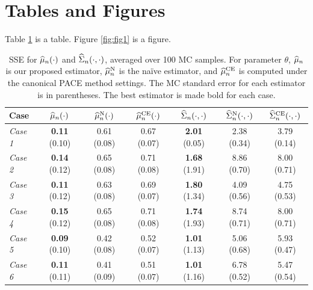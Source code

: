 \documentclass[useAMS, referee, usenatbib]{biom}
\begin{document}
\section*{Tables and Figures}
Table \ref{t:table1} is a table. Figure \ref{fig:fig1} is a figure.

\begin{table}
\centering
\begin{tabular*}{\columnwidth}{l@{\extracolsep{\fill}} 
c@{\extracolsep{\fill}}
c@{\extracolsep{\fill}}
c@{\extracolsep{\fill}}
c@{\extracolsep{\fill}}
c@{\extracolsep{\fill}}
c@{\extracolsep{\fill}}}
\hline
Case & $\widehat{\mu}_n(\cdot)$ & $\widehat{\mu}_n^{\text{N}}(\cdot)$ & $\widehat{\mu}_n^{\text{CE}}(\cdot)$ & $\widehat{\Sigma}_n(\cdot,\cdot)$ & $\widehat{\Sigma}_n^{\text{N}}(\cdot,\cdot)$ & $\widehat{\Sigma}_n^{\text{CE}}(\cdot,\cdot)$\\ 
\hline
\textit{Case 1 } & \textbf{0.11} (0.10) & 0.61 (0.08) & 0.67 (0.07) & \textbf{2.01} (0.05) & 2.38 (0.34) & 3.79 (0.14) \\
\textit{Case 2 } & \textbf{0.14} (0.12) & 0.65 (0.08) & 0.71 (0.08) & \textbf{1.68} (1.91) & 8.86 (0.70) & 8.00 (0.71) \\
\textit{Case 3 } & \textbf{0.11} (0.12) & 0.63 (0.08) & 0.69 (0.07) & \textbf{1.80} (1.34) & 4.09 (0.56) & 4.75 (0.53) \\
\textit{Case 4 } & \textbf{0.15} (0.12) & 0.65 (0.08) & 0.71 (0.08) & \textbf{1.74} (1.93) & 8.74 (0.71) & 8.00 (0.71) \\
\textit{Case 5 } & \textbf{0.09} (0.10) & 0.42 (0.08) & 0.52 (0.07) & \textbf{1.01} (1.13) & 5.06 (0.68) & 5.93 (0.47) \\
\textit{Case 6 } & \textbf{0.11} (0.11) & 0.41 (0.09) & 0.51 (0.07) & \textbf{1.01} (1.16) & 6.78 (0.52) & 5.47 (0.54)\\
\hline
\end{tabular*}\vskip12pt
\caption{SSE for $\widehat{\mu}_n(\cdot)$ and $\widehat{\Sigma}_n(\cdot,\cdot)$, averaged over 100 MC samples. For parameter $\theta$, $\widehat{\mu}_n$ is our proposed estimator, $\widehat{\mu}_n^{\text{N}}$ is the naïve estimator, and $\widehat{\mu}_n^{\text{CE}}$ is computed under the canonical PACE method settings. The MC standard error for each estimator is in parentheses. The best estimator is made bold for each case.}\label{t:table1}
\end{table}
\end{document}
